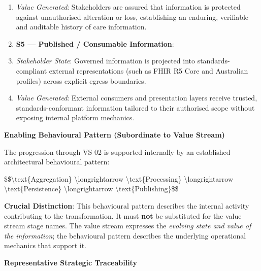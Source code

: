 \begin{enumerate}
\item \emph{Value Generated}: Stakeholders are assured that information is protected against unauthorised alteration or loss, establishing an enduring, verifiable and auditable history of care information.

\item \textbf{S5 — Published / Consumable Information}:

\item \emph{Stakeholder State}: Governed information is projected into standards-compliant external representations (such as FHIR R5 Core and Australian profiles) across explicit egress boundaries.

\item \emph{Value Generated}: External consumers and presentation layers receive trusted, standards-conformant information tailored to their authorised scope without exposing internal platform mechanics.

\end{enumerate}


\par\medskip\textbf{Enabling Behavioural Pattern (Subordinate to Value Stream)}\par


The progression through VS-02 is supported internally by an established architectural behavioural pattern:



\$\$\textbackslash{}text\{Aggregation\} \textbackslash{}longrightarrow \textbackslash{}text\{Processing\} \textbackslash{}longrightarrow \textbackslash{}text\{Persistence\} \textbackslash{}longrightarrow \textbackslash{}text\{Publishing\}\$\$



\textbf{Crucial Distinction}: This behavioural pattern describes the internal activity contributing to the transformation. It must \textbf{not} be substituted for the value stream stage names. The value stream expresses the \emph{evolving state and value of the information}; the behavioural pattern describes the underlying operational mechanics that support it.



\par\medskip\textbf{Representative Strategic Traceability}\par


